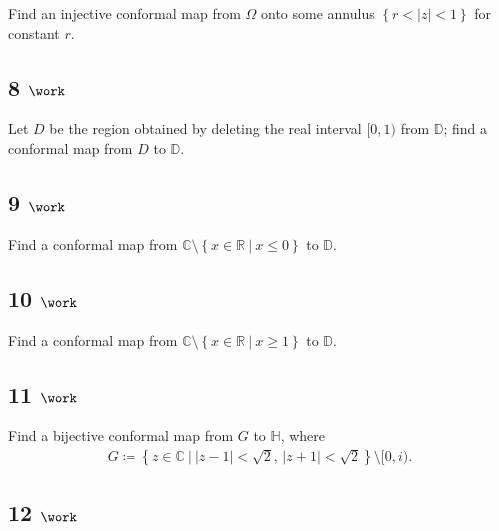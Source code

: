 Find an injective conformal map from \(\Omega\) onto some annulus
\(\left\{{r < {\left\lvert {z} \right\rvert} < 1}\right\}\) for constant
\(r\).

\hypertarget{work-43}{%
\subsection{\texorpdfstring{8
\(\work\)}{8 \textbackslash work}}\label{work-43}}

Let \(D\) be the region obtained by deleting the real interval
\([0, 1)\) from \({\mathbb{D}}\); find a conformal map from \(D\) to
\({\mathbb{D}}\).

\hypertarget{work-44}{%
\subsection{\texorpdfstring{9
\(\work\)}{9 \textbackslash work}}\label{work-44}}

Find a conformal map from
\({\mathbb{C}}\setminus\left\{{x\in {\mathbb{R}}{~\mathrel{\Big|}~}x\leq 0}\right\}\)
to \({\mathbb{D}}\).

\hypertarget{work-45}{%
\subsection{\texorpdfstring{10
\(\work\)}{10 \textbackslash work}}\label{work-45}}

Find a conformal map from
\({\mathbb{C}}\setminus\left\{{x\in {\mathbb{R}}{~\mathrel{\Big|}~}x\geq 1}\right\}\)
to \({\mathbb{D}}\).

\hypertarget{work-46}{%
\subsection{\texorpdfstring{11
\(\work\)}{11 \textbackslash work}}\label{work-46}}

Find a bijective conformal map from \(G\) to \({\mathbb{H}}\), where
\begin{align*}  
G \coloneqq\left\{{z\in {\mathbb{C}}{~\mathrel{\Big|}~}{\left\lvert {z-1} \right\rvert} < \sqrt 2,\, {\left\lvert {z+1} \right\rvert} < \sqrt 2}\right\} \setminus [0, i)
.\end{align*}

\hypertarget{work-47}{%
\subsection{\texorpdfstring{12
\(\work\)}{12 \textbackslash work}}\label{work-47}}

